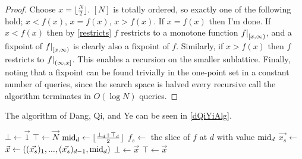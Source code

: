 \begin{proof}
  Choose $x = \lfloor \frac{N}{2} \rfloor$. $[N]$ is totally ordered, so exactly one of the following hold; 
  $x < f(x)$, $x = f(x)$, $x > f(x)$.
  If $x = f(x)$ then I'm done. If $x < f(x)$ then by \cref{restricts} $f$ restricts to a monotone function $\restr{f}{[x, \infty)}$, 
  and a fixpoint of $\restr{f}{[x, \infty)}$ is clearly also a fixpoint of $f$. Similarly, if $x > f(x)$ then $f$ restricts to
  $\restr{f}{(\infty, x]}$. This enables a recursion on the smaller sublattice. Finally,
  noting that a fixpoint can be found trivially in the one-point set in a constant number of queries,
  since the search space is halved every recursive call
  the algorithm terminates in $O(\log N)$ queries.
\end{proof}
The algorithm of Dang, Qi, and Ye can be seen in \cref{dQiYiAlg}.

\begin{algorithm}[h]
  \caption{\citep{dangQiYe}}\label{dQiYiAlg}
  \begin{algorithmic}[1]
    \State $\bot \gets \vec{1}$
    \State $\top \gets \vec{N}$
    \State \Return {}
  \EndProcedure
    \State $\text{mid}_d \gets \lfloor \frac{\bot_d + \top_d}{2} \rfloor$
    \State $f_s \gets$ the slice of $f$ at $d$ with value $\text{mid}_d$
    \State $\vec{x_s} \gets$ 
    \State $\vec{x} \gets ((\vec{x_s})_1, ..., (\vec{x_s})_{d-1}, \text{mid}_d)$
      \State {}
    \EndIf
      \State $\bot \gets \vec{x}$
    \EndIf
      \State $\top \gets \vec{x}$
    \EndIf
  \EndWhile
  \EndProcedure
  \end{algorithmic}
\end{algorithm}

